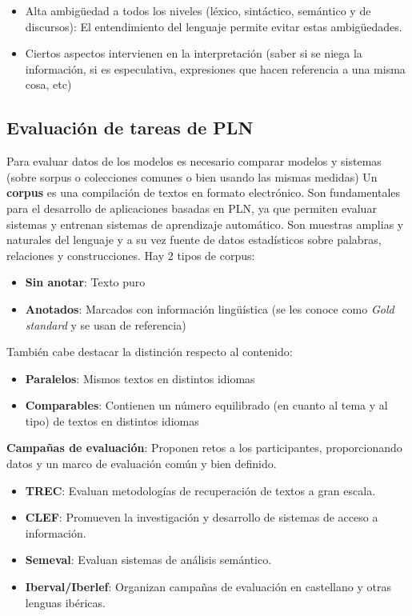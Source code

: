 \documentclass{ctexart}
\begin{document}
	\begin{itemize}
	\item Alta ambigüedad a todos los niveles (léxico, sintáctico, semántico y de discursos): El entendimiento del lenguaje permite evitar estas ambigüedades.
	\item Ciertos aspectos intervienen en la interpretación (saber si se niega la información, si es especulativa, expresiones que hacen referencia a una misma cosa, etc)
	\end{itemize}

	\subsection{Evaluación de tareas de PLN}
	Para evaluar datos de los modelos es necesario comparar modelos y sistemas (sobre sorpus o colecciones comunes o bien usando las mismas medidas)
	Un \textbf{corpus} es una compilación de textos en formato electrónico. Son fundamentales para el desarrollo de aplicaciones basadas en PLN, ya que permiten evaluar sistemas y entrenan sistemas de aprendizaje automático.
	Son muestras amplias y naturales del lenguaje y a su vez fuente de datos estadísticos sobre palabras, relaciones y construcciones.
	Hay 2 tipos de corpus:
	\begin{itemize}
		\item \textbf{Sin anotar}: Texto puro
		\item \textbf{Anotados}: Marcados con información lingüística (se les conoce como \textit{Gold standard} y se usan de referencia)
	\end{itemize}
	También cabe destacar la distinción respecto al contenido:
	\begin{itemize}
		\item \textbf{Paralelos}: Mismos textos en distintos idiomas
		\item \textbf{Comparables}: Contienen un número equilibrado (en cuanto al tema y al tipo) de textos en distintos idiomas
	\end{itemize}
	\textbf{Campañas de evaluación}: Proponen retos a los participantes, proporcionando datos y un marco de evaluación común y bien definido.
	\begin{itemize}
		\item \textbf{TREC}: Evaluan metodologías de recuperación de textos a gran escala.
		\item \textbf{CLEF}: Promueven la investigación y desarrollo de sistemas de acceso a información.
		\item \textbf{Semeval}: Evaluan sistemas de análisis semántico.
		\item \textbf{Iberval/Iberlef}: Organizan campañas de evaluación en castellano y otras lenguas ibéricas.
	\end{itemize}
\end{document}
